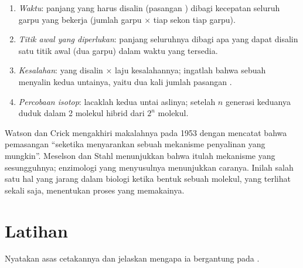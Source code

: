 \begin{method}\label{met:g11:dna-replication:calc}
\begin{enumerate}
  \item \emph{Waktu}: panjang yang harus disalin (pasangan ) dibagi
        kecepatan seluruh garpu yang bekerja (jumlah garpu $\times$
         tiap sekon tiap garpu).
  \item \emph{Titik awal yang diperlukan}: panjang seluruhnya dibagi
        apa yang dapat disalin satu titik awal (dua garpu) dalam waktu
        yang tersedia.
  \item \emph{Kesalahan}:  yang disalin $\times$ laju
        kesalahannya; ingatlah bahwa sebuah  menyalin kedua untainya,
        yaitu dua kali jumlah pasangan .
  \item \emph{Percobaan isotop}: lacaklah kedua untai aslinya; setelah
        $n$ generasi keduanya duduk dalam 2 molekul hibrid dari
        $2^n$ molekul.
\end{enumerate}
\end{method}

\begin{remark}\label{rem:g11:dna-replication:fit}
Watson dan Crick mengakhiri makalahnya pada 1953 dengan mencatat bahwa
pemasangan  ``seketika menyarankan sebuah mekanisme penyalinan
yang mungkin''. Meselson dan Stahl menunjukkan bahwa itulah mekanisme
yang sesungguhnya; enzimologi yang menyusulnya menunjukkan caranya.
Inilah salah satu hal yang jarang dalam biologi ketika bentuk sebuah
molekul, yang terlihat sekali saja, menentukan proses yang memakainya.
\end{remark}

\section{Latihan}

\begin{exercise}[$\star$]\label{exo:g11:dna-replication:1}
Nyatakan asas cetakannya dan jelaskan mengapa ia bergantung pada
.
\end{exercise}

